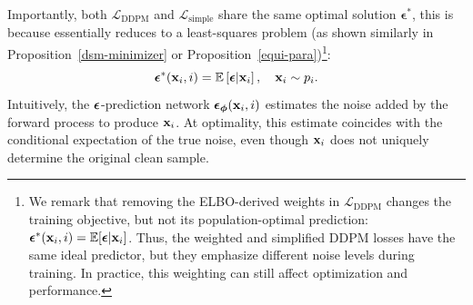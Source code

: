 Importantly, both $\mathcal{L}_{\text{DDPM}}$ and $\mathcal{L}_{\text{simple}}$ share the same optimal solution $\boldsymbol{\epsilon}^*$, this is because  essentially reduces to a least-squares problem (as shown similarly in Proposition~\ref{dsm-minimizer} or Proposition~\ref{equi-para})\footnote{We remark that removing the ELBO-derived weights in $\mathcal{L}_{\text{DDPM}}$ changes the training objective,
but not its population-optimal prediction: ${\bm{\epsilon}}^*({\mathbf{x}}_i,i)
=
\mathbb{E}[{\bm{\epsilon}}| {\mathbf{x}}_i]$.
Thus, the weighted and simplified DDPM losses have the same ideal predictor, but
they emphasize different noise levels during training. In practice, this weighting
can still affect optimization and performance.}:
\[
\boldsymbol{\epsilon}^*({\mathbf{x}}_i, i) = \mathbb{E}\left[ \boldsymbol{\epsilon}|{\mathbf{x}}_i \right], \quad {\mathbf{x}}_i \sim p_i.
\]
Intuitively, the ${\bm{\epsilon}}$-prediction network $\boldsymbol{\epsilon}_{\bm{\phi}}({\mathbf{x}}_i, i)$ estimates the noise added by the forward process to produce ${\mathbf{x}}_i$. At optimality, this estimate coincides with the conditional expectation of the true noise, even though ${\mathbf{x}}_i$ does not uniquely determine the original clean sample.

